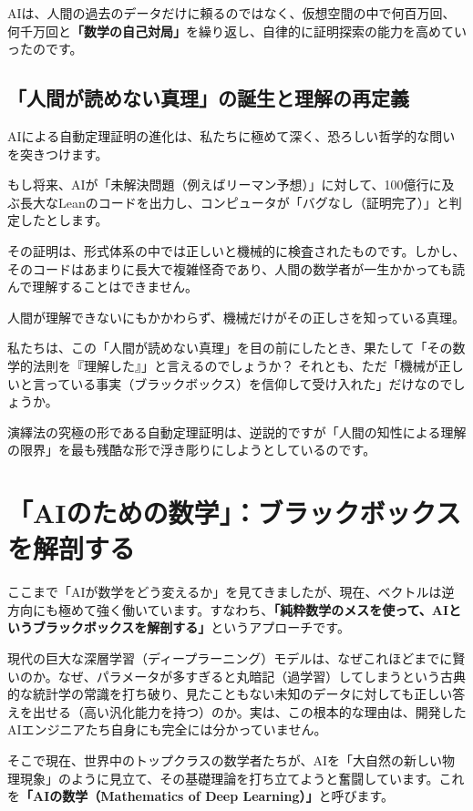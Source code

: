 AIは、人間の過去のデータだけに頼るのではなく、仮想空間の中で何百万回、何千万回と\textbf{「数学の自己対局」}を繰り返し、自律的に証明探索の能力を高めていったのです。

\subsection{「人間が読めない真理」の誕生と理解の再定義}

AIによる自動定理証明の進化は、私たちに極めて深く、恐ろしい哲学的な問いを突きつけます。

もし将来、AIが「未解決問題（例えばリーマン予想）」に対して、100億行に及ぶ長大なLeanのコードを出力し、コンピュータが「バグなし（証明完了）」と判定したとします。

その証明は、形式体系の中では正しいと機械的に検査されたものです。しかし、そのコードはあまりに長大で複雑怪奇であり、人間の数学者が一生かかっても読んで理解することはできません。

人間が理解できないにもかかわらず、機械だけがその正しさを知っている真理。

私たちは、この「人間が読めない真理」を目の前にしたとき、果たして「その数学的法則を『理解した』」と言えるのでしょうか？ それとも、ただ「機械が正しいと言っている事実（ブラックボックス）を信仰して受け入れた」だけなのでしょうか。

演繹法の究極の形である自動定理証明は、逆説的ですが「人間の知性による理解の限界」を最も残酷な形で浮き彫りにしようとしているのです。

\section{「AIのための数学」：ブラックボックスを解剖する}

ここまで「AIが数学をどう変えるか」を見てきましたが、現在、ベクトルは逆方向にも極めて強く働いています。すなわち、\textbf{「純粋数学のメスを使って、AIというブラックボックスを解剖する」}というアプローチです。

現代の巨大な深層学習（ディープラーニング）モデルは、なぜこれほどまでに賢いのか。なぜ、パラメータが多すぎると丸暗記（過学習）してしまうという古典的な統計学の常識を打ち破り、見たこともない未知のデータに対しても正しい答えを出せる（高い汎化能力を持つ）のか。実は、この根本的な理由は、開発したAIエンジニアたち自身にも完全には分かっていません。

そこで現在、世界中のトップクラスの数学者たちが、AIを「大自然の新しい物理現象」のように見立て、その基礎理論を打ち立てようと奮闘しています。これを\textbf{「AIの数学（Mathematics of Deep Learning）」}と呼びます。

